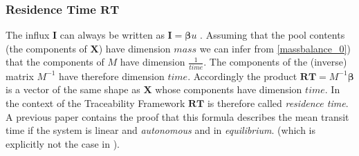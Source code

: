 \documentclass[journal abbreviation, manuscript]{copernicus}
\theoremstyle{definition}
\newcommand{\X}{\mathbf{X}}
\newcommand{\I}{\mathbf{I}}
\newcommand{\RT}{\mathbf{RT}}
\newcommand{\bv}{\bm{\beta}}
\begin{document}
\subsubsection{Residence Time $\RT$}
The influx $\I$ can always be written as $\I=\bv u$ .
Assuming that the pool contents (the components of $\X$)  have dimension $mass$ we can infer from \eqref{massbalance_0}) that the components of $M$ have dimension $\frac{1}{time}$.
The components of the (inverse) matrix $M^{-1}$ have therefore dimension $time$. Accordingly the product $\RT= M^{-1} \bv$ is a vector of the same shape as $\X$  whose components have dimension $time$.
In the context of the Traceability Framework $\RT$ is therefore called {\it residence time}.
A previous paper \citep[Proposition 1]{Rasmussen2016JMB} contains the proof that this formula describes the mean transit time if the system is linear and \emph{autonomous} and in \emph{equilibrium}. (which is explicitly not the case in \citep{Luo2017Biogeosciences}).
\end{document}
